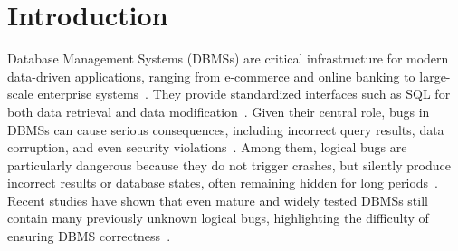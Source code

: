 \vspace{-2mm}
\section{Introduction}
\label{sec:intro}

Database Management Systems (DBMSs) are critical infrastructure for modern data-driven applications, ranging from e-commerce and online banking to large-scale enterprise systems~\cite{florescu1998database, zhou2020database}. 
They provide standardized interfaces such as SQL for both data retrieval and data modification~\cite{chamberlin1974sequel}. 
Given their central role, bugs in DBMSs can cause serious consequences, including incorrect query results, data corruption, and even security violations~\cite{zhong2020squirrel,jiang2023dynsql}. 
Among them, logical bugs are particularly dangerous because they do not trigger crashes, but silently produce incorrect results or database states, often remaining hidden for long periods~\cite{rigger2020detecting,kamm2023testing,song2023testing}. 
Recent studies have shown that even mature and widely tested DBMSs still contain many previously unknown logical bugs, highlighting the difficulty of ensuring DBMS correctness~\cite{rigger2020detecting,rigger2020finding,rigger2020testing,song2023testing,tang2023detecting,jiang2024detecting,song2024detecting,hao2023pinolo,deng2025detecting}. 

